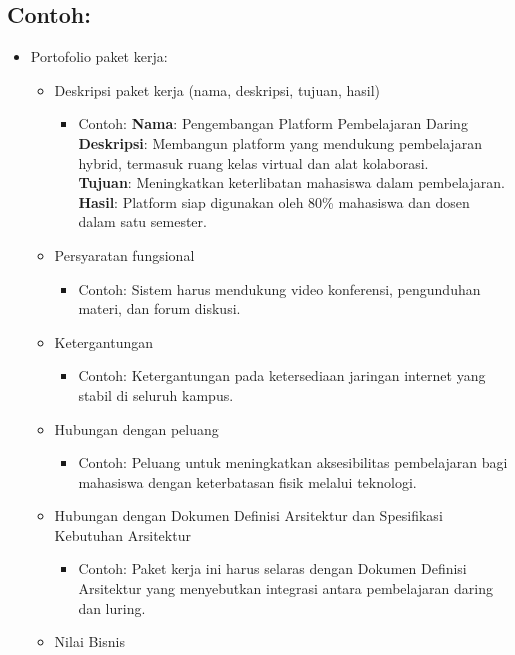 \subsection*{Contoh:}
\begin{itemize}
	\item Portofolio paket kerja:
	\begin{itemize}
		\item Deskripsi paket kerja (nama, deskripsi, tujuan, hasil)
		\begin{itemize}
			\item Contoh: 
			\textbf{Nama}: Pengembangan Platform Pembelajaran Daring \\
			\textbf{Deskripsi}: Membangun platform yang mendukung pembelajaran hybrid, termasuk ruang kelas virtual dan alat kolaborasi. \\
			\textbf{Tujuan}: Meningkatkan keterlibatan mahasiswa dalam pembelajaran. \\
			\textbf{Hasil}: Platform siap digunakan oleh 80\% mahasiswa dan dosen dalam satu semester.
		\end{itemize}
		\item Persyaratan fungsional
		\begin{itemize}
			\item Contoh: Sistem harus mendukung video konferensi, pengunduhan materi, dan forum diskusi.
		\end{itemize}
		\item Ketergantungan
		\begin{itemize}
			\item Contoh: Ketergantungan pada ketersediaan jaringan internet yang stabil di seluruh kampus.
		\end{itemize}
		\item Hubungan dengan peluang
		\begin{itemize}
			\item Contoh: Peluang untuk meningkatkan aksesibilitas pembelajaran bagi mahasiswa dengan keterbatasan fisik melalui teknologi.
		\end{itemize}
		\item Hubungan dengan Dokumen Definisi Arsitektur dan Spesifikasi Kebutuhan Arsitektur
		\begin{itemize}
			\item Contoh: Paket kerja ini harus selaras dengan Dokumen Definisi Arsitektur yang menyebutkan integrasi antara pembelajaran daring dan luring.
		\end{itemize}
		\item Nilai Bisnis

\end{itemize}
\end{itemize}
